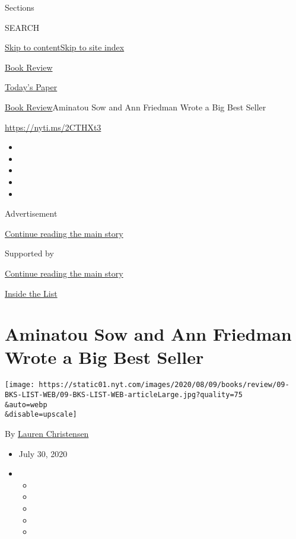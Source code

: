 Sections

SEARCH

\protect\hyperlink{site-content}{Skip to
content}\protect\hyperlink{site-index}{Skip to site index}

\href{https://www.nytimes.com/section/books/review}{Book Review}

\href{https://myaccount.nytimes.com/auth/login?response_type=cookie\&client_id=vi}{}

\href{https://www.nytimes.com/section/todayspaper}{Today's Paper}

\href{/section/books/review}{Book Review}\textbar{}Aminatou Sow and Ann
Friedman Wrote a Big Best Seller

\url{https://nyti.ms/2CTHXt3}

\begin{itemize}
\item
\item
\item
\item
\item
\end{itemize}

Advertisement

\protect\hyperlink{after-top}{Continue reading the main story}

Supported by

\protect\hyperlink{after-sponsor}{Continue reading the main story}

\href{/column/inside-the-list}{Inside the List}

\hypertarget{aminatou-sow-and-ann-friedman-wrote-a-big-best-seller}{%
\section{Aminatou Sow and Ann Friedman Wrote a Big Best
Seller}\label{aminatou-sow-and-ann-friedman-wrote-a-big-best-seller}}

\texttt{[image: https://static01.nyt.com/images/2020/08/09/books/review/09-BKS-LIST-WEB/09-BKS-LIST-WEB-articleLarge.jpg?quality=75\\\&auto=webp\\\&disable=upscale]}

By \href{https://www.nytimes.com/by/lauren-christensen}{Lauren
Christensen}

\begin{itemize}
\item
  July 30, 2020
\item
  \begin{itemize}
  \item
  \item
  \item
  \item
  \item
  \end{itemize}
\end{itemize}

